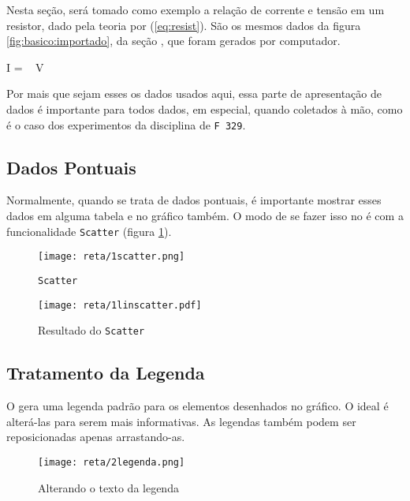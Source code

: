 Nesta seção, será tomado como exemplo a relação de corrente e tensão em um resistor, dado pela teoria por (\ref{eq:resist}). São os mesmos dados da figura \ref{fig:basico:importado}, da seção , que foram gerados por computador.

\begin{equacao} \label{eq:resist}
    I =  ~ V
\end{equacao}

Por mais que sejam esses os dados usados aqui, essa parte de apresentação de dados é importante para todos dados, em especial, quando coletados à mão, como é o caso dos experimentos da disciplina de \texttt{F 329}.


\subsection{Dados Pontuais}

    Normalmente, quando se trata de dados pontuais, é importante mostrar esses dados em alguma tabela e no gráfico também. O modo de se fazer isso no \software é com a funcionalidade \texttt{Scatter} (figura \ref{fig:reta:scatter}).

    \begin{figure}[htbp]
        \centering
        \texttt{[image: reta/1scatter.png]}

        \caption{\texttt{Scatter}}
        \label{fig:reta:scatter}
    \end{figure}

    \begin{figure}[htbp]
        \centering
        \texttt{[image: reta/1linscatter.pdf]}

        \caption{Resultado do \texttt{Scatter}}
        \label{fig:reta:linscatter}
    \end{figure}


\subsection{Tratamento da Legenda}

    O \software gera uma legenda padrão para os elementos desenhados no gráfico. O ideal é alterá-las para serem mais informativas. As legendas também podem ser reposicionadas apenas arrastando-as.

    \begin{figure}[htbp]
        \centering
        \texttt{[image: reta/2legenda.png]}

        \caption{Alterando o texto da legenda}
        \label{fig:reta:logenda}
    \end{figure}



